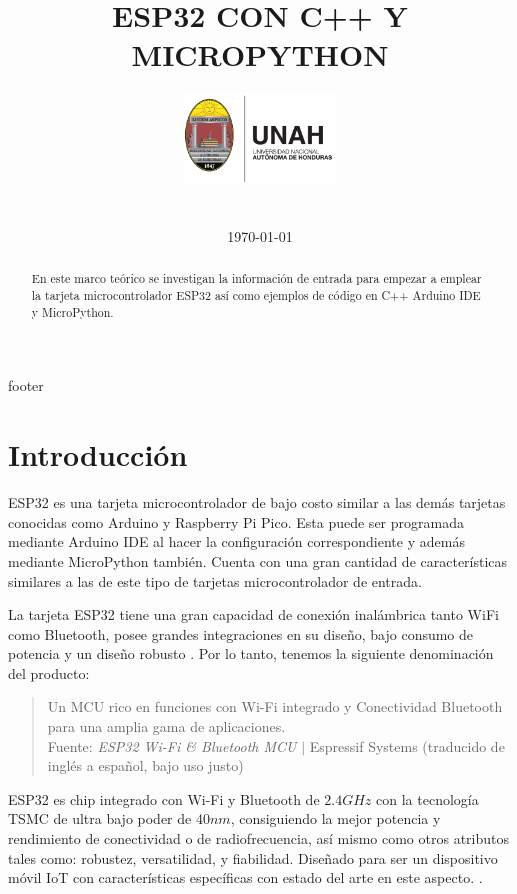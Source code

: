 \documentclass[conference]{IEEEtran}
\title{ESP32 CON C++ Y MICROPYTHON}
\author{
    \includegraphics[width = 40mm]{images/logo-unah}\\[8ex]
    \IEEEauthorblockN{Tobias Briones}
    \IEEEauthorblockN{tobias.briones@unah.hn}
    \IEEEauthorblockA{\textit{Universidad Nacional Autónoma de Honduras} \\
    \textit{Ingeniería de Sistemas} \\
    \textit{I PAC 2022} \\
    \textit{IS911-MICROPROCESADORES}} \\\vspace*{20pt} \normalsize  \\
    \today
}
\begin{document}
    \maketitle

    \begin{abstract}
        En este marco teórico se investigan la información de entrada para
        empezar a emplear la tarjeta microcontrolador ESP32 así como ejemplos
        de código en C++ Arduino IDE y MicroPython.
    \end{abstract}

    \tableofcontents

    {footer}

    \section{Introducción}\label{sec:introduction}

    ESP32 es una tarjeta microcontrolador de bajo costo
    \cite{wikipedia-esp32-2022} similar a las demás tarjetas conocidas como
    Arduino y Raspberry Pi Pico. Esta puede ser programada mediante Arduino
    IDE al hacer la configuración correspondiente y además mediante
    MicroPython también. Cuenta con una gran cantidad de características
    similares a las de este tipo de tarjetas microcontrolador de entrada.

    \bigbreak

    La tarjeta ESP32 tiene una gran capacidad de conexión inalámbrica tanto
    WiFi como Bluetooth, posee grandes integraciones en su diseño, bajo
    consumo de potencia y un diseño robusto
    \cite{espressif-systems-shanghai-co-ltd-2022A}. Por lo tanto, tenemos la
    siguiente denominación del producto:

    \bigbreak

    \begin{quote}
        Un MCU rico en funciones con Wi-Fi integrado y Conectividad Bluetooth
        para una amplia gama de aplicaciones.\\ \footnotesize
        Fuente: \textit{ESP32 Wi-Fi \& Bluetooth MCU} $\mid$ Espressif
        Systems \cite{espressif-systems-shanghai-co-ltd-2022A} (traducido de
        inglés a español, bajo uso justo)
    \end{quote}

    \bigbreak

    ESP32 es chip integrado con Wi-Fi y Bluetooth de $2.4GHz$ con la
    tecnología TSMC de ultra bajo poder de $40nm$, consiguiendo la mejor
    potencia y rendimiento de conectividad o de radiofrecuencia, así mismo
    como otros atributos tales como: robustez, versatilidad, y fiabilidad.
    Diseñado para ser un dispositivo móvil IoT con características
    específicas con estado del arte en este aspecto.
    \cite{espressif-systems-shanghai-co-ltd-2022B}.
\end{document}
